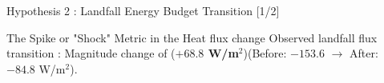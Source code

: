 \begin{frame}{Hypothesis 2 : Landfall Energy Budget Transition [1/2]}
	\vspace{0.2cm}
	\begin{exampleblock}{\footnotesize The Spike or "Shock" Metric in the Heat flux change}
		\footnotesize Observed landfall flux transition : Magnitude change of (\textbf{$+68.8$ W/m$^2$})\footnotemark[6] (Before: $-153.6$ $\rightarrow$ After: $-84.8$ W/m$^2$).
	\end{exampleblock}

\end{frame}

